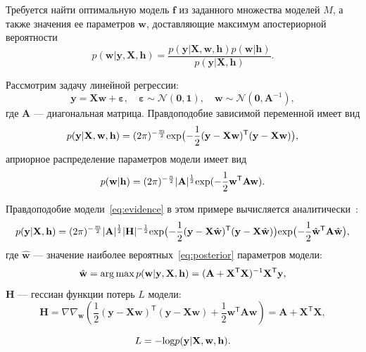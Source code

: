 Требуется найти оптимальную модель $\mathbf{f}$ из заданного множества моделей $M$, а также значения ее параметров $\mathbf{w}$, доставляющие максимум апостериорной вероятности
\begin{equation}
\label{eq:var_inf_posterior}
	p(\mathbf{w}|\mathbf{y},\mathbf{X},\mathbf{h}) = \frac{p(\mathbf{y}|\mathbf{X}, \mathbf{w}, \mathbf{h})p(\mathbf{w}|\mathbf{h})}{p(\mathbf{y}|\mathbf{X}, \mathbf{h})}.
\end{equation}


\begin{example}
Рассмотрим задачу линейной регрессии:
\[
	\mathbf{y} =\mathbf{X} \mathbf{w} + \boldsymbol{\varepsilon},\quad \boldsymbol{\varepsilon}  \sim \mathcal{N}(\mathbf{0},\mathbf{1}),\quad \mathbf{w} \sim  \mathcal{N}(\mathbf{0},\mathbf{A}^{-1}),
\]
где $\mathbf{A}$ --- диагональная матрица. 
Правдоподобие зависимой переменной имеет вид
\begin{equation}
\label{eq:example1}
	p(\mathbf{y}|  \mathbf{X}, \mathbf{w}, \mathbf{h}) = (2\pi) ^{-\frac{m}{2}} \textnormal{exp} \bigl(-\frac{1}{2}(\mathbf{y} -\mathbf{X} \mathbf{w})^\mathsf{T}(\mathbf{y} - \mathbf{X}\mathbf{w})\bigr),
\end{equation}
априорное распределение параметров модели имеет вид
\begin{equation}
\label{eq:prior}	
p(\mathbf{w}|\mathbf{h}) =  (2\pi) ^{-\frac{n}{2}} |\mathbf{A}|^{\frac{1}{2}} \textnormal{exp} (-\frac{1}{2}\mathbf{w}^\mathsf{T}\mathbf{A}\mathbf{w}).
\end{equation}

Правдоподобие модели~\eqref{eq:evidence} в этом примере вычисляется аналитически~\cite{hyperopt}:
\begin{equation}
\label{eq:ground}
	p(\mathbf{y}|\mathbf{X},\mathbf{h})  =  (2\pi) ^{-\frac{m}{2}} |\mathbf{A}|^{\frac{1}{2}} |\mathbf{H}|^{-\frac{1}{2}}  \textnormal{exp}\bigl(-\frac{1}{2}(\mathbf{y} -\mathbf{X} \hat{\mathbf{w}})^\mathsf{T}(\mathbf{y} - \mathbf{X}\hat{\mathbf{w}})\bigr)\textnormal{exp} \bigl(-\frac{1}{2}\hat{\mathbf{w}}^\mathsf{T}\mathbf{A}\hat{\mathbf{w}}\bigr),
\end{equation}
где $\hat{\mathbf{w}}$ --- значение наиболее вероятных~\eqref{eq:posterior} параметров модели:
\[
	\hat{\mathbf{w}} = \operatorname*{arg\,max} p(\mathbf{w}|\mathbf{y}, \mathbf{X}, \mathbf{h}) = (\mathbf{A} + \mathbf{X}^\mathsf{T}\mathbf{X})^{-1}\mathbf{X}^\mathsf{T}\mathbf{y},
\]
$\mathbf{H}$ --- гессиан функции потерь $L$ модели:
\[
	\mathbf{H}	= \nabla \nabla_\mathbf{w} \left(\frac{1}{2} (\mathbf{y} -\mathbf{X} {\mathbf{w}})^\mathsf{T}(\mathbf{y} - \mathbf{X}{\mathbf{w}}) + \frac{1}{2}\mathbf{w}^\mathsf{T}\mathbf{A}\mathbf{w} \right) = \mathbf{A} + \mathbf{X}^\mathsf{T}\mathbf{X},
\]

\[ 
	L = - \textnormal{log} p(\mathbf{y}|  \mathbf{X}, \mathbf{w}, \mathbf{h}). 
\]
\end{example}

